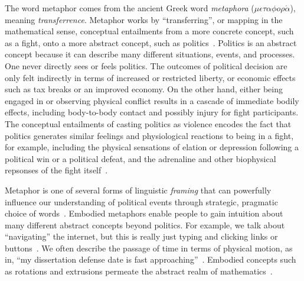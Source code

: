 \documentclass[12pt,letterpaper]{article}
\begin{document}
The word metaphor
comes from the ancient Greek word \emph{metaphora} 
($\mu \epsilon \tau \alpha \phi o \rho \acute{\alpha}$), meaning
\emph{transferrence}.  Metaphor works by ``transferring'', or mapping in
the mathematical sense, conceptual entailments
from a more concrete concept, such as a fight, onto a more abstract concept,
such as politics~\cite{Regier1996,Kovecses2010a,Lakoff2014}. 
Politics is an abstract concept because it can describe many
different situations, events, and processes. One never directly sees or feels
politics. The outcomes of political decision are only felt indirectly in terms
of increased or restricted liberty, or economic effects such as tax breaks or
an improved economy.  On the other hand, either being engaged in or observing physical conflict
results in a cascade of immediate bodily effects, including body-to-body contact and
possibly injury for fight participants. The conceptual entailments of casting
politics as violence encodes the fact that politics generates similar 
feelings and physiological reactions to being in a fight, for example, 
including the physical sensations of elation or depression following a political win
or a political defeat, and the adrenaline and other biophysical repsonses
of the fight itself~\cite{Gallese2005,David2016}.

Metaphor is one of several forms of linguistic \emph{framing} that can 
powerfully influence our understanding of political
events through strategic, pragmatic choice of 
words~\cite{Fillmore1982,Chong2007,Lakoff2008,Charteris-Black2009,Fausey2011,Matlock2012,Sagi2013a,Cacciatore2016}.
Embodied metaphors enable people to gain intuition about many different
abstract concepts beyond politics. 
For example, we talk about ``navigating'' the internet, but this is 
really just typing and clicking links or buttons~\cite{Matlock2014}.
We often describe the passage of time in terms of physical motion, as in,
``my dissertation defense date is fast 
approaching''~\cite{Matlock2005,Nunez2012,Flusberg2017a}.
Embodied concepts such as rotations and extrusions permeate the abstract realm
of mathematics~\cite{Lakoff1997,Marghetis2013}. 
\end{document}
